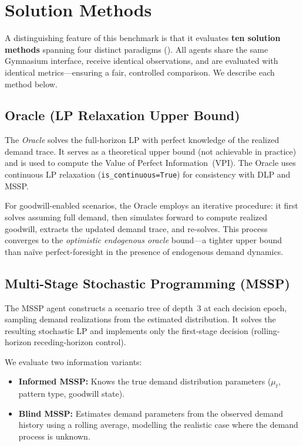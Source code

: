 
\section{Solution Methods}\label{sec:methods}

A distinguishing feature of this benchmark is that it evaluates
\textbf{ten solution methods} spanning four distinct paradigms
(). All agents share the same Gymnasium interface,
receive identical observations, and are evaluated with identical
metrics---ensuring a fair, controlled comparison. We describe each
method below.

\subsection{Oracle (LP Relaxation Upper Bound)}

The \emph{Oracle} solves the full-horizon LP with perfect knowledge of
the realized demand trace. It serves as a theoretical upper bound
(not achievable in practice) and is used to compute the Value of
Perfect Information~(VPI). The Oracle uses continuous LP relaxation
(\texttt{is\_continuous=True}) for consistency with DLP and MSSP.

For goodwill-enabled scenarios, the Oracle employs an iterative
procedure: it first solves assuming full demand, then simulates
forward to compute realized goodwill, extracts the updated demand
trace, and re-solves. This process converges to the
\emph{optimistic endogenous oracle} bound---a tighter upper bound than
na\"ive perfect-foresight in the presence of endogenous demand dynamics.

\subsection{Multi-Stage Stochastic Programming (MSSP)}

The MSSP agent constructs a scenario tree of depth~3 at each decision
epoch, sampling demand realizations from the estimated distribution.
It solves the resulting stochastic LP and implements only the
first-stage decision (rolling-horizon receding-horizon control).

We evaluate two information variants:
\begin{itemize}
  \item \textbf{Informed MSSP:} Knows the true demand distribution
        parameters ($\mu_t$, pattern type, goodwill state).
  \item \textbf{Blind MSSP:} Estimates demand parameters from the
        observed demand history using a rolling average, modelling the
        realistic case where the demand process is unknown.
\end{itemize}

